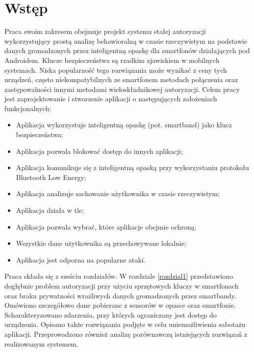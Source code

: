 \chapter{Wstęp}
\thispagestyle{chapterBeginStyle}
\label{wstep}

Praca swoim zakresem obejmuje projekt systemu stałej autoryzacji wykorzystujący prostą analizę behawioralną w czasie rzeczywistym na 
podstawie danych gromadzonych przez inteligentną opaskę dla smartfonów działających pod Androidem. Klucze bezpieczeństwa są rzadkim zjawiskiem w 
mobilnych systemach. Niska popularność tego rozwiązania może wynikać z ceny tych urządzeń, często niekompatybilnych ze smartfonem metodach połączenia oraz 
zastępowalności innymi metodami wieloskładnikowej autoryzacji.
\newline\newline
\indent Celem pracy jest zaprojektowanie i stworzenie aplikacji o następujących założeniach funkcjonalnych: 
\begin{itemize}
	\item Aplikacja wykorzystuje inteligentną opaskę (pot. smartband) jako klucz bezpieczeństwa;
	\item Aplikacja pozwala blokować dostęp do innych aplikacji;
    \item Aplikacja komunikuje się z inteligentną opaską przy wykorzystaniu protokołu Bluetooth Low Energy;
    \item Aplikacja analizuje zachowanie użytkownika w czasie rzeczywistym;
    \item Aplikacja działa w tle;
    \item Aplikacja pozwala wybrać, które aplikacje obejmie ochroną;
    \item Wszystkie dane użytkownika są przechowywane lokalnie;
    \item Aplikacja jest odporna na popularne ataki.
\end{itemize}

\indent Praca składa się z sześciu rozdziałów. W rozdziale \ref{rozdzial1} przedstawiono dogłębnie problem autoryzacji przy użyciu sprzętowych kluczy w smartfonach oraz braku prywatności wrażliwych danych gromadzonych przez smartbandy. 
Omówiono szczegółowo dane pobierane z sensorów w opasce oraz smartfonie. Scharakteryzowano zdarzenia, przy których ograniczany jest dostęp do 
urządzenia. Opisano także rozwiązania podjęte w celu uniemożliwienia sabotażu aplikacji. Przeprowadzono również analizę porównawczą istniejących rozwiązań z realizowanym 
systemem.

